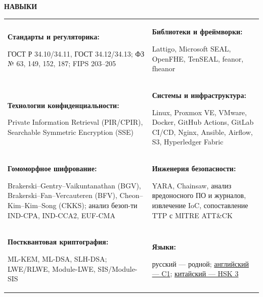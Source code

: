 \documentclass[11pt,a4paper]{article}
\newcommand{\cvrow}[2]{%
  \noindent
  \begin{minipage}[t]{0.145\textwidth}
    \vspace{0pt}%
    \raggedright
    \fontsize{8.5}{10}\selectfont
    \bfseries\MakeUppercase{#1}
  \end{minipage}%
  \hfill
  \begin{minipage}[t]{0.835\textwidth}
    \vspace{0pt}%
    #2
  \end{minipage}\par
}
\newcommand{\skillcell}[2]{%
  \textbf{#1}\par
  #2
}
\begin{document}
\cvrow{Навыки}{%
  \begin{tabularx}{\linewidth}
    {@{}>{\raggedright\arraybackslash}X
    @{\hspace{1.2em}}
    >{\raggedright\arraybackslash}X@{}}

    \skillcell{Стандарты и регуляторика:}{%
      ГОСТ Р 34.10/34.11, ГОСТ 34.12/34.13;
      ФЗ № 63, 149, 152, 187; FIPS 203--205}
    &
    \skillcell{Библиотеки и фреймворки:}{%
      Lattigo, Microsoft SEAL, OpenFHE, TenSEAL,
      feanor, fheanor}
    \\[0.20em]

    \skillcell{Технологии конфиденциальности:}{%
      Private Information Retrieval (PIR/CPIR),
      Searchable Symmetric Encryption (SSE)}
    &
    \skillcell{Системы и инфраструктура:}{%
      Linux, Proxmox VE, VMware, Docker,
      GitHub Actions, GitLab CI/CD, Nginx, Ansible,
      Airflow, S3,
      Hyperledger Fabric}
    \\[0.20em]

    \skillcell{Гомоморфное шифрование:}{%
      Brakerski--Gentry--Vaikuntanathan (BGV),
      Brakerski--Fan--Vercauteren (BFV),
      Cheon--Kim--Kim--Song (CKKS);
      анализ безоп-ти IND-CPA, IND-CCA2, EUF-CMA}
    &
    \skillcell{Инженерия безопасности:}{%
      YARA, Chainsaw, анализ вредоносного ПО и журналов,
      извлечение IoC, сопоставление TTP с MITRE ATT\&CK}
    \\[0.20em]

    \skillcell{Постквантовая криптография:}{%
      ML-KEM, ML-DSA, SLH-DSA;
      LWE/RLWE, Module-LWE, SIS/Module-SIS}
    &
    \skillcell{Языки:}{%
      русский --- родной;
      \href{https://iasenovets.github.io/files/toefl_8cd5f4a2b8ec8f34da49ea0faeef43f1.pdf}{английский --- C1};
    \href{https://admin.chinesetest.cn/queryScore.do?sid=c2tActR9Wb\%2704b861aefbdc5e9fd0b44afa717d08cbceb0720e582ce25f\%2724d7sWsQ5nVUQSwD}
        {китайский --- HSK 3}}
  \end{tabularx}
}

\vspace{0.50em}
\end{document}
